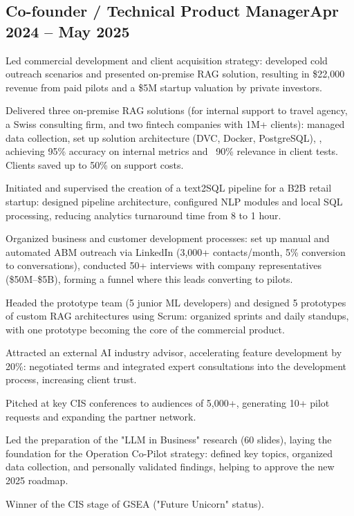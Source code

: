 \documentclass[a4paper,12pt]{article}
\begin{document}
\subsection{{Co-founder / Technical Product Manager}\hfill Apr 2024 -- May 2025}
\begin{zitemize}
\item Led commercial development and client acquisition strategy: developed cold outreach scenarios and presented on-premise RAG solution, resulting in \$22,000 revenue from paid pilots and a \$5M startup valuation by private investors.
\item Delivered three on-premise RAG solutions (for internal support to travel agency, a Swiss consulting firm, and two fintech companies with 1M+ clients): managed data collection, set up solution architecture (DVC, Docker, PostgreSQL), , achieving 95\% accuracy on internal metrics and ~90\% relevance in client tests. Clients saved up to 50\% on support costs.
\item Initiated and supervised the creation of a text2SQL pipeline for a B2B retail startup: designed pipeline architecture, configured NLP modules and local SQL processing, reducing analytics turnaround time from 8 to 1 hour.
\item Organized business and customer development processes: set up manual and automated ABM outreach via LinkedIn (3,000+ contacts/month, 5\% conversion to conversations), conducted 50+ interviews with company representatives (\$50M--\$5B), forming a funnel where this leads converting to pilots.
\item Headed the prototype team (5 junior ML developers) and designed 5 prototypes of custom RAG architectures using Scrum: organized sprints and daily standups, with one prototype becoming the core of the commercial product.
\item Attracted an external AI industry advisor, accelerating feature development by 20\%: negotiated terms and integrated expert consultations into the development process, increasing client trust.
\item Pitched at key CIS conferences to audiences of 5,000+, generating 10+ pilot requests and expanding the partner network.
\item Led the preparation of the "LLM in Business" research (60 slides), laying the foundation for the Operation Co-Pilot strategy: defined key topics, organized data collection, and personally validated findings, helping to approve the new 2025 roadmap.
\item Winner of the CIS stage of GSEA ("Future Unicorn" status).
\end{zitemize}
\end{document}

